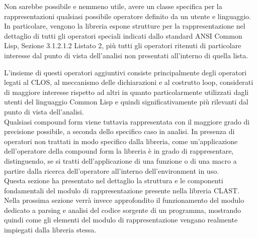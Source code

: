 Non sarebbe possibile e nemmeno utile, avere un classe specifica per la
rappresentazioni qualsiasi possibile operatore definito da un utente e
linguaggio. In particolare, vengono la libreria espone strutture per la
rappresentazione nel dettaglio di tutti gli operatori speciali indicati dallo
standard ANSI Common Lisp, Sezione 3.1.2.1.2 Listato 2, più tutti gli operatori
ritenuti di particolare interesse dal punto di vista dell’analisi non presentati
all’interno di quella lista.

L'insieme di questi operatori aggiuntivi consiste principalmente degli
operatori legati al CLOS, al meccanismo delle dichiarazioni e al costrutto
loop, considerati di maggiore interesse rispetto ad altri in quanto
particolarmente utilizzati dagli utenti del linguaggio Common Lisp e quindi
significativamente più rilevanti dal punto di vista dell’analisi.\\

Qualsiasi compound form viene tuttavia rappresentata con il maggiore grado di
precisione possibile, a seconda dello specifico caso in analisi. In presenza di
operatori non trattati in modo specifico dalla libreria, come un'applicazione
dell'operatore della compound form la libreria è in grado di rappresentare,
distinguendo, se si tratti dell’applicazione di una funzione o di una macro a
partire dalla ricerca dell'operatore all'interno dell'environment in uso.\\

Questa sezione ha presentato nel dettaglio la struttura e le componenti
fondamentali del modulo di rappresentazione presente nella libreria CLAST.
Nella prossima sezione verrà invece approfondito il funzionamento del modulo
dedicato a parsing e analisi del codice sorgente di un programma, mostrando
quindi come gli elementi del modulo di rappresentazione vengano realmente
impiegati dalla libreria stessa.
